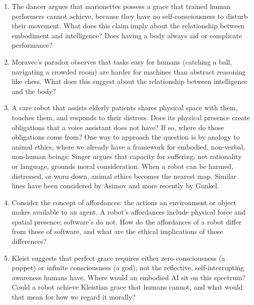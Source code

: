 \begin{enumerate}
    \item The dancer argues that marionettes possess a grace that
    trained human performers cannot achieve, because they have no
    self-consciousness to disturb their movement. What does this claim
    imply about the relationship between embodiment and intelligence?
    Does having a body always aid or complicate performance?

    \item Moravec's paradox observes that tasks easy for humans
    (catching a ball, navigating a crowded room) are harder for
    machines than abstract reasoning like chess. What does this suggest
    about the relationship between intelligence and the body?

    \item A care robot that assists elderly patients shares physical
    space with them, touches them, and responds to their distress. Does
    its physical presence create obligations that a voice assistant
    does not have? If so, where do those obligations come from? One
    way to approach the question is by analogy to animal ethics, where
    we already have a framework for embodied, non-verbal, non-human
    beings: Singer\cite{singer1975animal} argues that capacity for
    suffering, not rationality or language, grounds moral
    consideration. When a robot can be harmed, distressed, or worn
    down, animal ethics becomes the nearest map. Similar lines have
    been considered by Asimov\cite{asimov1951foundation} and more
    recently by Gunkel\cite{gunkel2018robot}.

    \item Consider the concept of affordances: the actions an
    environment or object makes available to an agent. A robot's
    affordances include physical force and spatial presence; software's
    do not. How do the affordances of a robot differ from those of
    software, and what are the ethical implications of those
    differences?

    \item Kleist suggests that perfect grace requires either zero
    consciousness (a puppet) or infinite consciousness (a god), not
    the reflective, self-interrupting awareness humans have. Where
    would an embodied AI sit on this spectrum? Could a robot achieve
    Kleistian grace that humans cannot, and what would that mean for
    how we regard it morally?\\
\end{enumerate}



